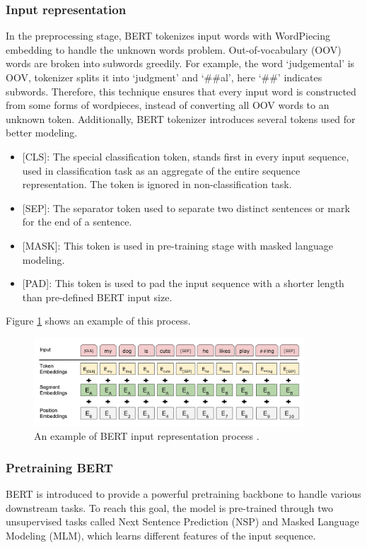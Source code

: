 \subsubsection{Input representation}
In the preprocessing stage, BERT tokenizes input words with WordPiecing embedding \cite{wu2016google} to handle the unknown words problem. Out-of-vocabulary (OOV) words are broken into subwords greedily. For example, the word ‘judgemental’ is OOV, tokenizer splits it into ‘judgment’ and ‘\#\#al’, here ‘\#\#’ indicates subwords. Therefore, this technique ensures that every input word is constructed from some forms of wordpieces, instead of converting all OOV words to an unknown token.
Additionally, BERT tokenizer introduces several tokens used for better modeling.
\begin{itemize}
    \item {[CLS]}: The special classification token, stands first in every input sequence, used in classification task as an aggregate of the entire sequence representation. The token is ignored in non-classification task.
    \item {[SEP]}: The separator token used to separate two distinct sentences or mark for the end of a sentence.
    \item {[MASK]}: This token is used in pre-training stage with masked language modeling.
    \item {[PAD]}: This token is used to pad the input sequence with a shorter length than pre-defined BERT input size.
\end{itemize}
Figure \ref{fig:BERT_input} shows an example of this process.
\begin{figure}
    \centering
    \includegraphics[width=0.9\textwidth]{images/BERT_input.png}
    \caption{An example of BERT input representation process \cite{devlin2018bert}.}
    \label{fig:BERT_input}
\end{figure}
\subsubsection{Pretraining BERT}
BERT is introduced to provide a powerful pretraining backbone to handle various downstream tasks. To reach this goal, the model is pre-trained through two unsupervised tasks called Next Sentence Prediction (NSP) and Masked Language Modeling (MLM), which learns different features of the input sequence.

